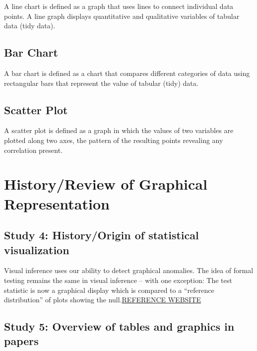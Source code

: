 \documentclass[print]{nuthesis}
\begin{document}
A line chart is defined as a graph that uses lines to connect individual data points. A line graph displays quantitative and qualitative variables of tabular data (tidy data).

\hypertarget{bar-chart}{%
\subsection{Bar Chart}\label{bar-chart}}

A bar chart is defined as a chart that compares different categories of data using rectangular bars that represent the value of tabular (tidy) data.

\hypertarget{scatter-plot}{%
\subsection{Scatter Plot}\label{scatter-plot}}

A scatter plot is defined as a graph in which the values of two variables are plotted along two axes, the pattern of the resulting points revealing any correlation present.

\hypertarget{historyreview-of-graphical-representation}{%
\section{History/Review of Graphical Representation}\label{historyreview-of-graphical-representation}}

\hypertarget{study-4-historyorigin-of-statistical-visualization}{%
\subsection{Study 4: History/Origin of statistical visualization}\label{study-4-historyorigin-of-statistical-visualization}}

Visual inference uses our ability to detect graphical anomalies. The idea of formal testing remains the same in visual inference -- with one exception: The test statistic is now a graphical display which is compared to a ``reference distribution'' of plots showing the null.\href{}{REFERENCE WEBSITE}

\hypertarget{study-5-overview-of-tables-and-graphics-in-papers}{%
\subsection{Study 5: Overview of tables and graphics in papers}\label{study-5-overview-of-tables-and-graphics-in-papers}}
\end{document}
